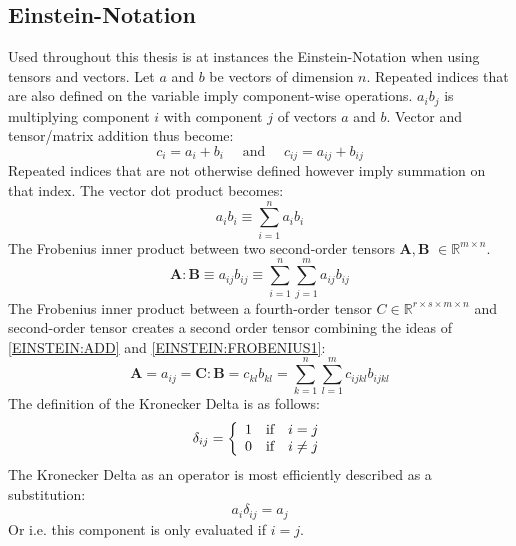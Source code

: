 \documentclass[m,times]{cgMA}
\begin{document}
\subsection{Einstein-Notation}
Used throughout this thesis is at instances the Einstein-Notation when using tensors and vectors. Let $a$ and $b$ be vectors of dimension $n$. Repeated indices that are also defined on the variable imply component-wise operations.
$a _ { i } b _ { j }$ is multiplying component $i$ with component $j$ of vectors $a$ and $b$. Vector and tensor/matrix addition thus become:
\begin{equation} \label{EINSTEIN:ADD}
  c _ { i } = a _ { i } + b _ { i } \quad \text { and } \quad c _ { i j } = a _ { i j } + b _ { i j }
\end{equation}
Repeated indices that are not otherwise defined however imply summation on that index. The vector dot product becomes:
\begin{equation}
  a _ { i } b _ { i } \equiv \sum _ { i = 1 } ^ { n } a _ { i } b _ { i }
\end{equation}
The Frobenius inner product between two second-order tensors $\mathbf{A,B}$ $\in \mathbb { R } ^ { m \times n }$.
\begin{equation} \label{EINSTEIN:FROBENIUS1}
  \mathbf { A } : \mathbf { B } \equiv a _ { i j } b _ { i j } \equiv \sum _ { i = 1 } ^ { n } \sum _ { j = 1 } ^ { m } a _ { ij } b _ { ij }
\end{equation}
The Frobenius inner product between a fourth-order tensor $C \in \mathbb { R } ^ {r \times s \times m \times n }$  and second-order tensor creates a second order tensor combining the ideas of \ref{EINSTEIN:ADD} and \ref{EINSTEIN:FROBENIUS1}:
\begin{equation}
  \mathbf { A } = a_ {ij} =  \mathbf {C} : \mathbf { B } = c _ {k l} b _ { k l  } = \sum _ { k = 1 } ^ { n } \sum _ { l = 1 } ^ { m } c _ { ijkl } b _ { ijkl }
\end{equation}
The definition of the Kronecker Delta is as follows:
\begin{equation}
  \delta _ { i j } = \left\{
    \begin{array} { l l l }
      { 1 } & {\text{if}} &  {i = j}  \\
      { 0 } & {\text{if}} &  { i \neq j }
  \end{array} \right.
\end{equation}
The Kronecker Delta as an operator is most efficiently described as a substitution:
\begin{equation}
  a _ { i } \delta _ { i j } = a _ { j }
\end{equation}
Or i.e. this component is only evaluated if $i = j$.
\cite{MCGINTY:CONTINUUM}
\end{document}
